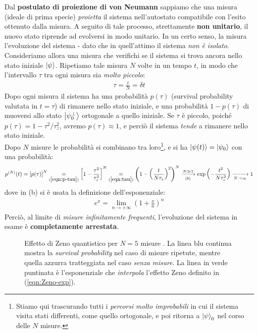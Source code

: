 \documentclass[../../InformazioneQuantistica.tex]{subfiles}
\begin{document}
Dal \textbf{postulato di proiezione di von Neumann} sappiamo che una misura (ideale di prima specie) \textit{proietta} il sistema nell'autostato compatibile con l'esito ottenuto dalla misura. A seguito di tale processo, strettamente \textbf{non unitario}, il nuovo stato riprende ad evolversi in modo unitario. In un certo senso, la misura  l'evoluzione del sistema - dato che in quell'attimo il sistema \textit{non è isolato}.\\

Consideriamo allora una misura che verifichi se il sistema si trova ancora nello stato iniziale $\Ket{\psi}$. Ripetiamo tale misura $N$ volte in un tempo $t$, in modo che l'intervallo $\tau$ tra ogni misura sia \textit{molto piccolo}:
\begin{align}
\tau = \frac{t}{N} = \delta t\label{eqn:tau}
\end{align}
Dopo ogni misura il sistema ha una probabilità $p(\tau)$ (survival probability valutata in $t=\tau$) di rimanere nello stato iniziale, e una probabilità $1-p(\tau)$ di muoversi allo stato $\Ket{\psi_0^\perp}$ ortogonale a quello iniziale. Se $\tau$ è piccolo, poiché $p(\tau) = 1-\tau^2/\tau_z^2$, avremo $p(\tau) \approx 1$, e perciò il sistema \textit{tende} a rimanere nello stato iniziale.\\

Dopo $N$ misure le probabilità si combinano tra loro\footnote{Stiamo qui trascurando tutti i \textit{percorsi molto improbabili} in cui il sistema visita stati differenti, come quello ortogonale, e poi ritorna a $\Ket{\psi}_0$ nel corso delle $N$ misure.}, e si ha $\Ket{\psi(t)}=\Ket{\psi_0}$ con una probabilità:
\begin{align}
p^{(N)}(t) = \left[p(\tau)\right]^N \underset{(\ref{eqn:p-tau})}{=} \left[1-\frac{\tau^2}{\tau_z^2}\right]^N \underset{(\ref{eqn:tau})}{=} \left(1-\left(\frac{t}{N \tau_z}\right)^2\right)^N \xrightarrow[(b)]{N \gg 1} \exp\left(-\frac{t^2}{N\tau_z^2}\right) \xrightarrow[{N\to\infty}]{}1
\label{eqn:Pnt}
\end{align}
dove in (b) si è usata la definizione dell'esponenziale:
\begin{align*}
e^x = \lim_{n\to+\infty} \left(1+\frac{x}{n}\right)^n
\end{align*}
Perciò, al limite di \textit{misure infinitamente frequenti}, l'evoluzione del sistema in esame è \textbf{completamente arrestata}.

\begin{figure}[H]
\centering

\caption{Effetto di Zeno quantistico per $N=5$ misure . La linea blu continua mostra la \textit{survival probability} nel caso di misure ripetute, mentre quella azzurra tratteggiata nel caso \textit{senza misure}. La linea in verde puntinata è l'esponenziale che \textit{interpola} l'effetto Zeno definito in (\ref{eqn:Zeno-exp}).\label{fig:effetto-Zeno}}
\end{figure}
\end{document}
